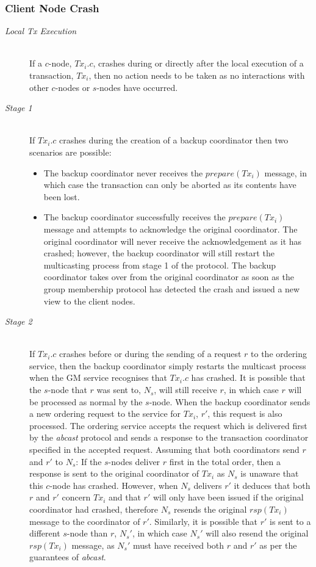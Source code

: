     \subsubsection*{Client Node Crash}
	\begin{description}
         \item[\emph{Local Tx Execution}]  \hfill \\
         If a $c$-node, $Tx_i.c$, crashes during or directly after the local execution of a transaction, $Tx_i$, then no action needs to be taken as no interactions with other $c$-nodes or $s$-nodes have occurred.  
		
		\item[\emph{Stage 1}]  \hfill \\
		If $Tx_i.c$ crashes during the creation of a backup coordinator then two scenarios are possible:
		    \begin{itemize}
			    \item    The backup coordinator never receives the $prepare(Tx_i)$ message, in which case the transaction  can only be aborted as its contents have been lost.  
			    \item    The backup coordinator successfully receives the $prepare(Tx_i)$ message and attempts to acknowledge the original coordinator.  The original coordinator will never receive the acknowledgement as it has crashed; however, the backup coordinator will still restart the multicasting process from stage 1 of the protocol. The backup coordinator takes over from the original coordinator as soon as the group membership protocol has detected the crash and issued a new view to the client nodes.  
		    \end{itemize}     
		    
		\item[\emph{Stage 2}]  \hfill \\
        If $Tx_i.c$ crashes before or during the sending of a request $r$ to the ordering service, then the backup coordinator simply restarts the multicast process when the GM service recognises that $Tx_i.c$ has crashed.  It is possible that the $s$-node that $r$ was sent to, $N_s$, will still receive $r$, in which case $r$ will be processed as normal by the $s$-node.  When the backup coordinator sends a new ordering request to the service for $Tx_i$, $r'$, this request is also processed.  The ordering service accepts the request which is delivered first by the \emph{abcast} protocol and sends a response to the transaction coordinator specified in the accepted request.  Assuming that both coordinators send $r$ and $r'$ to $N_s$: If the $s$-nodes deliver $r$ first in the total order, then a response is  sent to the original coordinator of $Tx_i$ as $N_s$ is unaware that this $c$-node has crashed.  However, when $N_s$ delivers $r'$ it deduces that both $r$ and $r'$ concern $Tx_i$ and that $r'$ will only have been issued if the original coordinator had crashed, therefore $N_s$ resends the original $rsp(Tx_i)$ message to the coordinator of $r'$.  Similarly, it is possible that $r'$ is sent to a different $s$-node than $r$, $N_s'$, in which case $N_s'$ will also resend the original $rsp(Tx_i)$ message, as $N_s'$ must have received both $r$ and $r'$ as per the guarantees of \emph{abcast}.  
        

\end{description}
